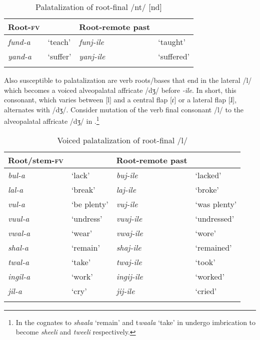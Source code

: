 \documentclass[output=paper]{langsci/langscibook}
\begin{document}
\begin{table}
\begin{tabularx}{.66\textwidth}{XXlX}
\lsptoprule
Root-\textsc{fv} &  & Root-remote past & \\
\midrule
\textit{fund-a} & `teach' & \textit{funj-ile} & `taught' \\
\textit{yand-a} & `suffer' & \textit{yanj-ile} & `suffered' \\

\lspbottomrule
\end{tabularx}

\caption{Palatalization of root-final /nt/ [nd]}
\label{tab:11.kawasha}

 \end{table}


Also susceptible to palatalization are verb roots/bases that end in the lateral /l/ which becomes a voiced alveopalatal affricate /dʒ/ before \textit{-ile}. In short, this consonant, which varies between [l] and a central flap [ɾ] or a lateral flap [ɺ], alternates with /dʒ/. Consider mutation of the verb final consonant /l/ to the alveopalatal affricate /dʒ/ in .\footnote{In  the cognates to \textit{shaala} ‘remain’ and t\textit{waala }‘take’ in  undergo imbrication to become \textit{sheeli} and \textit{tweeli} respectively.}


\begin{table}
\begin{tabularx}{\textwidth}{XXXX}
\lsptoprule
Root/stem-\textsc{fv} &  & Root-remote past & \\
\midrule 
\textit{bul-a} & `lack' & \textit{buj-ile} & `lacked' \\
\textit{lal-a} & `break' & \textit{laj-ile} & `broke' \\
\textit{vul-a} & `be plenty' & \textit{vuj-ile} & `was plenty' \\
\textit{vuul-a} & `undress' & \textit{vuuj-ile} & `undressed' \\
\textit{vwal-a} & `wear' & \textit{vwaj-ile} & `wore' \\
\textit{shal-a} & `remain' & \textit{shaj-ile} & `remained' \\
\textit{twal-a} & `take' & \textit{twaj-ile} & `took' \\
\textit{ingil-a} & `work' & \textit{ingij-ile} & `worked' \\
\textit{jil-a} & `cry' & \textit{jij-ile} & `cried' \\


\lspbottomrule
\end{tabularx}

\caption{Voiced palatalization of root-final /l/}
\label{tab:12.kawasha}

\end{table}
\end{document}
